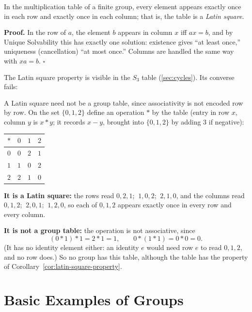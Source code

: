 \documentclass[11pt]{report}
\renewenvironment{proof}[1][Proof]{\noindent\textbf{#1.} }{\hfill$\square$\par\vspace{5pt}}
\begin{document}
\begin{corbox}\label{cor:latin-square-property}
In the multiplication table of a finite group, every element appears exactly once in each row and exactly once in each column; that is, the table is a \emph{Latin square}.
\end{corbox}

\begin{proof}
In the row of $a$, the element $b$ appears in column $x$ iff $ax = b$, and by Unique Solvability this has exactly one solution: existence gives ``at least once,'' uniqueness (cancellation) ``at most once.'' Columns are handled the same way with $xa = b$.
\end{proof}

The Latin square property is visible in the $S_3$ table (\ref{sec:cycles}). Its converse fails:

\begin{exbox}\label{ex:latin-square-not-group-table}
A Latin square need not be a group table, since associativity is not encoded row by row. On the set $\{0, 1, 2\}$ define an operation $\ast$ by the table (entry in row $x$, column $y$ is $x \ast y$; it records $x - y$, brought into $\{0, 1, 2\}$ by adding $3$ if negative):
\begin{center}
\begin{tabular}{c|ccc}
$\ast$ & $0$ & $1$ & $2$ \\ \hline
$0$ & $0$ & $2$ & $1$ \\
$1$ & $1$ & $0$ & $2$ \\
$2$ & $2$ & $1$ & $0$
\end{tabular}
\end{center}
\textbf{It is a Latin square:} the rows read $0, 2, 1$; $\ 1, 0, 2$; $\ 2, 1, 0$, and the columns read $0, 1, 2$; $\ 2, 0, 1$; $\ 1, 2, 0$, so each of $0, 1, 2$ appears exactly once in every row and every column.

\textbf{It is not a group table:} the operation is not associative, since
\[ (0 \ast 1) \ast 1 = 2 \ast 1 = 1, \qquad 0 \ast (1 \ast 1) = 0 \ast 0 = 0. \]
(It has no identity element either: an identity $e$ would need row $e$ to read $0, 1, 2$, and no row does.) So no group has this table, although the table has the property of Corollary~\ref{cor:latin-square-property}.
\end{exbox}

\section{Basic Examples of Groups}\label{sec:examples}
\end{document}

